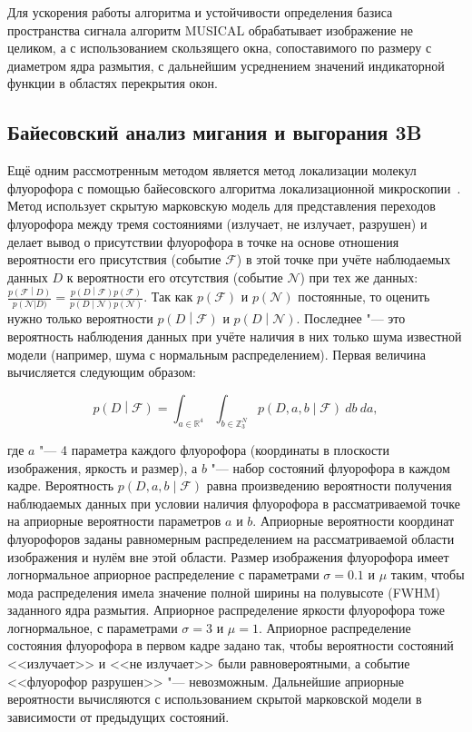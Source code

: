 Для ускорения работы алгоритма и устойчивости определения базиса пространства сигнала алгоритм MUSICAL обрабатывает изображение не целиком, а с использованием скользящего окна, сопоставимого по размеру с диаметром ядра размытия, с дальнейшим усреднением значений индикаторной функции в областях перекрытия окон.

\subsection{Байесовский анализ мигания и выгорания 3B}

Ещё одним рассмотренным методом является метод локализации молекул флуорофора с помощью байесовского алгоритма локализационной микроскопии~\cite{cox2012bayesian}. Метод использует скрытую марковскую модель для представления переходов флуорофора между тремя состояниями (излучает, не излучает, разрушен) и делает вывод о присутствии флуорофора в точке на основе отношения вероятности его присутствия (событие $\mathcal{F}$) в этой точке при учёте наблюдаемых данных $D$ к вероятности его отсутствия (событие $\mathcal{N}$) при тех же данных: $\frac{p\left(\mathcal{F}\middle| D\right)}{p\left(\mathcal{N}\right|D)} = \frac{p\left(D\middle|\mathcal{F}\right)p\left(\mathcal{F}\right)} {p\left(D\middle|\mathcal{N}\right)p\left(\mathcal{N}\right)}$. Так как $p\left(\mathcal{F}\right)$ и $p\left(\mathcal{N}\right)$ постоянные, то оценить нужно только вероятности $p\left(D\middle|\mathcal{F}\right)$ и $p\left(D\middle|\mathcal{N}\right)$. Последнее "--- это вероятность наблюдения данных при учёте наличия в них только шума известной модели (например, шума с нормальным распределением). Первая величина вычисляется следующим образом:

\begin{equation*}
	p\left(D\middle|\mathcal{F}\right)=\int_{a\in\mathbb{R}^4}\int_{b\in\mathbb{Z}_3^N}{p\left(D,a,b\middle|\mathcal{F}\right)\ db\ da},
\end{equation*}

\noindent где $a$ "--- 4 параметра каждого флуорофора (координаты в плоскости изображения, яркость и размер), а $b$ "--- набор состояний флуорофора в каждом кадре. Вероятность $p\left(D,a,b\middle|\mathcal{F}\right)$ равна произведению вероятности получения наблюдаемых данных при условии наличия флуорофора в рассматриваемой точке на априорные вероятности параметров $a$ и $b$. Априорные вероятности координат флуорофоров заданы равномерным распределением на рассматриваемой области изображения и нулём вне этой области. Размер изображения флуорофора имеет логнормальное априорное распределение с параметрами $\sigma=0.1$ и $\mu$ таким, чтобы мода распределения имела значение полной ширины на полувысоте (FWHM) заданного ядра размытия. Априорное распределение яркости флуорофора тоже логнормальное, с параметрами $\sigma=3$ и $\mu=1$. Априорное распределение состояния флуорофора в первом кадре задано так, чтобы вероятности состояний <<излучает>> и <<не излучает>> были равновероятными, а событие <<флуорофор разрушен>> "--- невозможным. Дальнейшие априорные вероятности вычисляются с использованием скрытой марковской модели в зависимости от предыдущих состояний.

